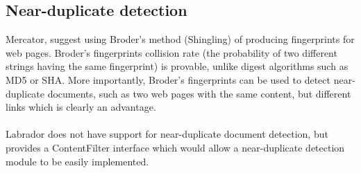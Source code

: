 \subsection{Near-duplicate detection}
Mercator\cite{ref2}, suggest using Broder's\cite{ref11,ref12} method (Shingling) of producing fingerprints for web pages. Broder's fingerprints collision rate (the probability of two different strings having the same fingerprint) is provable, unlike digest algorithms such as MD5 or SHA. More importantly, Broder's fingerprints can be used to detect near-duplicate documents, such as two web pages with the same content, but different links which is clearly an advantage.\\
\ \\
Labrador does not have support for near-duplicate document detection, but provides a ContentFilter interface which would allow a near-duplicate detection module to be easily implemented.
